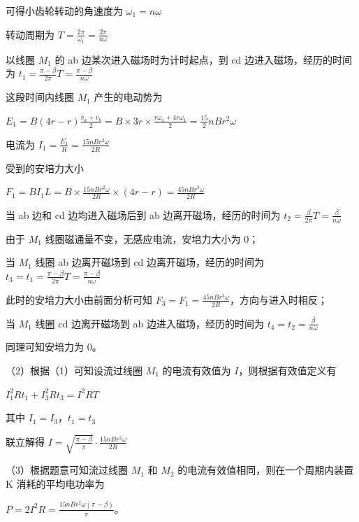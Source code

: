 \documentclass[\gkver]{gaokaozhenti}
\begin{document}
\begin{enumerate}
{可得小齿轮转动的角速度为 $\omega_{1} = n\omega$

转动周期为 $T = \frac{2\pi}{\omega_{1}} = \frac{2\pi}{n\omega}$

以线圈 $M_{1}$ 的 ab 边某次进入磁场时为计时起点，到 cd 边进入磁场，经历的时间为 $t_{1} = \frac{\pi - \beta}{2\pi}T = \frac{\pi - \beta}{n\omega}$

这段时间内线圈 $M_{1}$ 产生的电动势为

$E_{1} = B(4r - r)\frac{v_{a} + v_{b}}{2} = B \times 3r \times \frac{r\omega_{1} + 4r\omega_{1}}{2} = \frac{15}{2}nBr^{2}\omega$

电流为 $I_{1} = \frac{E_{1}}{R} = \frac{15nBr^{2}\omega}{2R}$

受到的安培力大小

$F_{1} = BI_{1}L = B \times \frac{15nBr^{2}\omega}{2R} \times (4r - r) = \frac{45nBr^{3}\omega}{2R}$

当 ab 边和 cd 边均进入磁场后到 ab 边离开磁场，经历的时间为 $t_{2} = \frac{\beta}{2\pi}T = \frac{\beta}{n\omega}$

由于 $M_{1}$ 线圈磁通量不变，无感应电流，安培力大小为 0；

当 $M_{1}$ 线圈 ab 边离开磁场到 cd 边离开磁场，经历的时间为 $t_{3} = t_{1} = \frac{\pi - \beta}{2\pi}T = \frac{\pi - \beta}{n\omega}$

此时的安培力大小由前面分析可知 $F_{3} = F_{1} = \frac{45nBr^{3}\omega}{2R}$，方向与进入时相反；

当 $M_{1}$ 线圈 cd 边离开磁场到 ab 边进入磁场，经历的时间为 $t_{4} = t_{2} = \frac{\beta}{n\omega}$

同理可知安培力为 0。

（2）根据（1）可知设流过线圈 $M_{1}$ 的电流有效值为 $I$，则根据有效值定义有

$I_{1}^{2}Rt_{1} + I_{3}^{2}Rt_{3} = I^{2}RT$

其中 $I_{1} = I_{3}$，$t_{1} = t_{3}$

联立解得 $I = \sqrt{\frac{\pi - \beta}{\pi}} \cdot \frac{15nBr^{2}\omega}{2R}$

（3）根据题意可知流过线圈 $M_{1}$ 和 $M_{2}$ 的电流有效值相同，则在一个周期内装置 K 消耗的平均电功率为

$P = 2I^{2}R = \frac{15nBr^{2}\omega(\pi - \beta)}{\pi}$。
}

\end{enumerate}
\end{document}
